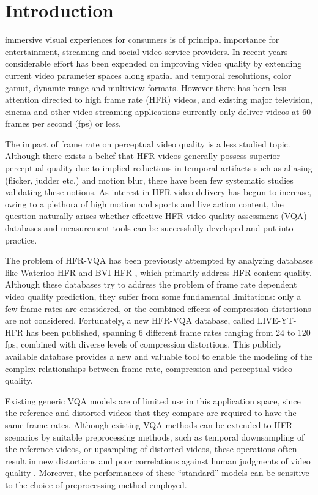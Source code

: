 \documentclass[journal]{IEEEtran}
\begin{document}
\section{Introduction}
 immersive visual experiences for consumers is of principal importance for entertainment, streaming and social video service providers. In recent years considerable effort has been expended on improving video quality by extending current video parameter spaces along spatial and temporal resolutions, color gamut, dynamic range and multiview formats. However there has been less attention directed to high frame rate (HFR) videos, and existing major television, cinema and other video streaming applications currently only deliver videos at 60 frames per second (fps) or less.

The impact of frame rate on perceptual video quality is a less studied topic. Although there exists a belief that HFR videos generally possess superior perceptual quality due to implied reductions in temporal artifacts such as aliasing (flicker, judder etc.) and motion blur, there have been few systematic studies validating these notions. As interest in HFR video delivery has begun to increase, owing to a plethora of high motion and sports and live action content, the question naturally arises whether effective HFR video quality assessment (VQA) databases and measurement tools can be successfully developed and put into practice. 

The problem of HFR-VQA has been previously attempted by analyzing databases like Waterloo HFR \cite{nasiri2015perceptual} and BVI-HFR \cite{mackin2018study}, which primarily address HFR content quality. Although these databases try to address the problem of frame rate dependent video quality prediction, they suffer from some fundamental limitations: only a few frame rates are considered, or the combined effects of compression distortions are not considered. Fortunately, a new HFR-VQA database, called LIVE-YT-HFR \cite{pavan2020liveythfr} has been published, spanning 6 different frame rates ranging from 24 to 120 fps, combined with diverse levels of compression distortions. This publicly available database provides a new and valuable tool to enable the modeling of the complex relationships between frame rate, compression and perceptual video quality.

Existing generic VQA models are of limited use in this application space, since the reference and distorted videos that they compare are required to have the same frame rates. Although existing VQA methods can be extended to HFR scenarios by suitable preprocessing methods, such as temporal downsampling of the reference videos, or upsampling of distorted videos, these operations often result in new distortions and poor correlations against human judgments of video quality \cite{pavan2020liveythfr}. Moreover, the performances of these ``standard'' models can be sensitive to the choice of preprocessing method employed. 
\end{document}
